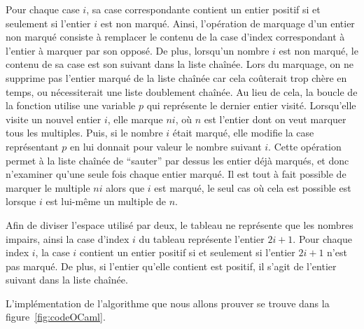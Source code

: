 \documentclass[a4paper]{easychair}
\begin{document}
Pour chaque case $i$, sa case correspondante contient un entier positif
si et seulement si l'entier $i$ est non marqué.
Ainsi, l'opération de marquage d'un entier non marqué consiste à remplacer le
contenu de la case d'index correspondant à l'entier à marquer par son opposé.
De plus, lorsqu'un nombre $i$ est non marqué, le contenu de sa case est son
suivant dans la liste chaînée.
Lors du marquage, on ne supprime pas l'entier marqué de la liste chaînée car
cela coûterait trop chère en temps, ou nécessiterait une liste doublement
chaînée. Au lieu de cela, la boucle de la fonction 
utilise une variable $p$ qui représente le dernier entier visité.
Lorsqu'elle visite un nouvel entier $i$, elle marque $ni$, où $n$ est
l'entier dont on veut marquer tous les multiples.
Puis, si le nombre $i$ était marqué, elle modifie la case représentant $p$ en lui
donnait pour valeur le nombre suivant $i$. Cette opération permet à la liste
chaînée de ``sauter'' par dessus les entier déjà marqués, et donc n'examiner
qu'une seule fois chaque entier marqué.
Il est tout à fait possible de marquer le multiple $ni$ alors que $i$ est marqué,
le seul cas où cela est possible est lorsque $i$ est lui-même un multiple de $n$.

Afin de diviser l'espace utilisé par deux, le tableau ne représente que les nombres
impairs, ainsi la case d'index $i$ du tableau représente l'entier $2i + 1$.
Pour chaque index $i$, la case $i$ contient un entier positif si et
seulement si l'entier $2i + 1$ n'est pas marqué.
De plus, si l'entier qu'elle contient est positif, il s'agit de l'entier suivant
dans la liste chaînée.


L'implémentation de l'algorithme que nous allons prouver se trouve dans la
figure~\ref{fig:codeOCaml}.
\end{document}
